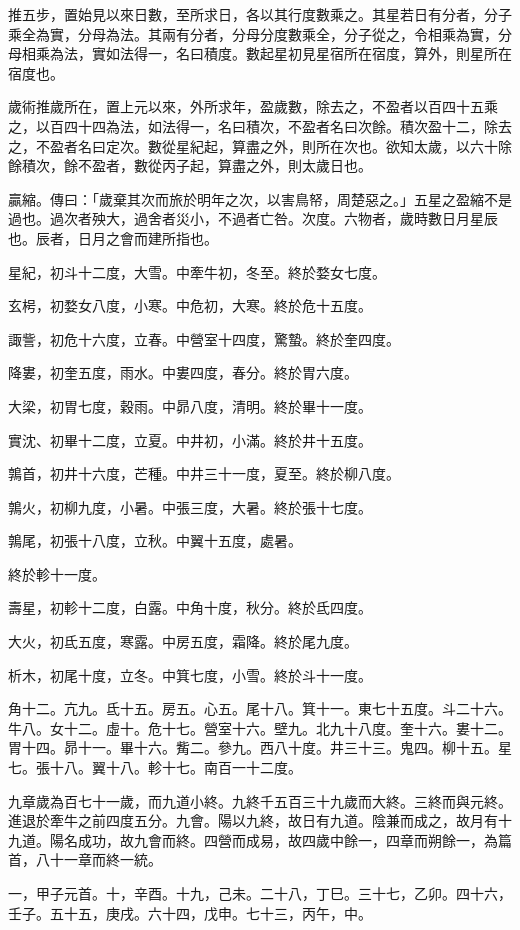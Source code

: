 \begin{pinyinscope}
推五步，置始見以來日數，至所求日，各以其行度數乘之。其星若日有分者，分子乘全為實，分母為法。其兩有分者，分母分度數乘全，分子從之，令相乘為實，分母相乘為法，實如法得一，名曰積度。數起星初見星宿所在宿度，算外，則星所在宿度也。

歲術推歲所在，置上元以來，外所求年，盈歲數，除去之，不盈者以百四十五乘之，以百四十四為法，如法得一，名曰積次，不盈者名曰次餘。積次盈十二，除去之，不盈者名曰定次。數從星紀起，算盡之外，則所在次也。欲知太歲，以六十除餘積次，餘不盈者，數從丙子起，算盡之外，則太歲日也。

贏縮。傳曰：「歲棄其次而旅於明年之次，以害鳥帑，周楚惡之。」五星之盈縮不是過也。過次者殃大，過舍者災小，不過者亡咎。次度。六物者，歲時數日月星辰也。辰者，日月之會而建所指也。

星紀，初斗十二度，大雪。中牽牛初，冬至。終於婺女七度。

玄枵，初婺女八度，小寒。中危初，大寒。終於危十五度。

諏訾，初危十六度，立春。中營室十四度，驚蟄。終於奎四度。

降婁，初奎五度，雨水。中婁四度，春分。終於胃六度。

大梁，初胃七度，穀雨。中昴八度，清明。終於畢十一度。

實沈、初畢十二度，立夏。中井初，小滿。終於井十五度。

鶉首，初井十六度，芒種。中井三十一度，夏至。終於柳八度。

鶉火，初柳九度，小暑。中張三度，大暑。終於張十七度。

鶉尾，初張十八度，立秋。中翼十五度，處暑。

終於軫十一度。

壽星，初軫十二度，白露。中角十度，秋分。終於氐四度。

大火，初氐五度，寒露。中房五度，霜降。終於尾九度。

析木，初尾十度，立冬。中箕七度，小雪。終於斗十一度。

角十二。亢九。氐十五。房五。心五。尾十八。箕十一。東七十五度。斗二十六。牛八。女十二。虛十。危十七。營室十六。壁九。北九十八度。奎十六。婁十二。胃十四。昴十一。畢十六。觜二。參九。西八十度。井三十三。鬼四。柳十五。星七。張十八。翼十八。軫十七。南百一十二度。

九章歲為百七十一歲，而九道小終。九終千五百三十九歲而大終。三終而與元終。進退於牽牛之前四度五分。九會。陽以九終，故日有九道。陰兼而成之，故月有十九道。陽名成功，故九會而終。四營而成易，故四歲中餘一，四章而朔餘一，為篇首，八十一章而終一統。

一，甲子元首。十，辛酉。十九，己未。二十八，丁巳。三十七，乙卯。四十六，壬子。五十五，庚戌。六十四，戊申。七十三，丙午，中。


\end{pinyinscope}
